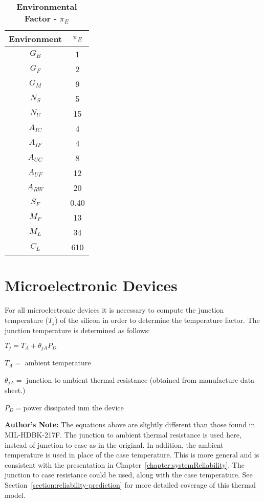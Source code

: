 \begin{table}[h]
\caption{\textbf{Environmental Factor -} $\pi_{E}$}
\label{table:capacitanceFactor}
\begin{tabular}{|c|c|} \hline
\rowcolor{Gray}
\textbf{Environment} & $\pi_{E}$ \\ \hline
$G_{B}$ & 1 \\ \hline
$G_{F}$ & 2 \\ \hline
$G_{M}$ & 9 \\ \hline
$N_{S}$ & 5 \\ \hline
$N_{U}$ & 15 \\ \hline
$A_{IC}$ & 4 \\ \hline
$A_{IF}$ & 4 \\ \hline
$A_{UC}$ & 8 \\ \hline
$A_{UF}$ & 12 \\ \hline
$A_{RW}$ & 20 \\ \hline
$S_{F}$ & 0.40 \\ \hline
$M_{F}$ & 13 \\ \hline
$M_{L}$ & 34 \\ \hline
$C_{L}$ & 610 \\ \hline
\end{tabular}
\end{table}

\newpage

\section{Microelectronic Devices}
\label{section:microelectronic-devices}

For all microelectronic devices it is necessary to compute the junction
temperature ($T_{j}$) of the silicon in order to determine the temperature 
factor. The junction temperature is determined as follows:

\begin{description}
\item $T_{j} = T_{A} +  \theta_{jA} P_{D}$
\item $T_A = $ ambient temperature
\item $\theta_{jA} = $ junction to ambient thermal resistance (obtained from manufacture data sheet.)
\item $P_{D} = $power dissipated inm the device
\end{description}

\textbf{Author's Note:} The equations above are slightly different than
those found in MIL-HDBK-217F. The junction to ambient thermal resistance
is used here, instead of junction to case as in the original. In
addition, the ambient temperature is used in place of the case
temperature. This is more general and is consistent with the
presentation in Chapter~\ref{chapter:systemReliability}. The junction to case 
resistance could be used, along with the case temperature. See 
Section~\ref{section:reliability-prediction} for more detailed
coverage of this thermal model.

